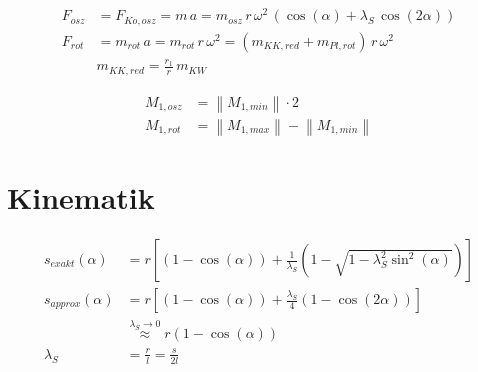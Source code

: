\documentclass[english,threecolumn,color]{latex4ei/latex4ei_sheet}
\begin{document}
\begin{sectionbox}
	\begin{align*}
	F_{osz}&=F_{Ko,osz}=m\,a
	=m_{osz}\,r\,\omega^2\,\left( \cos(\alpha)+\lambda_S\,\cos(2\alpha) \right)\\
	F_{rot}&=m_{rot}\,a=m_{rot}\,r\,\omega^2
	=\left( m_{KK,red}+m_{Pl,rot} \right)\,r\,\omega^2\\
	&m_{KK,red}=\frac{r_1}{r}\,m_{KW}
	\end{align*}
\end{sectionbox}
\begin{sectionbox}
	\begin{align*}
		M_{1,osz}&= \left\|M_{1,min}\right\|\cdot 2\\
		M_{1,rot}&=\left\|M_{1,max}\right\| -\left\|M_{1,min}\right\|
	\end{align*}
\end{sectionbox}

\columnbreak
\section{Kinematik}

\begin{sectionbox}
	\begin{align*}
		s_{exakt}(\alpha)&=r \left[ ( 1- \cos(\alpha) )+\frac{1}{\lambda_S} \left( 1- \sqrt{1-\lambda_S^2  \sin^2(\alpha)} \right) \right]\\
		s_{approx}(\alpha)&=r  \left[ ( 1- \cos(\alpha) )+ \frac{\lambda_S}{4} ( 1- \cos(2 \alpha) ) \right]\\
		&\overset{\lambda_S \to 0}{\approx} r  ( 1- \cos(\alpha) )\\
		\lambda_S&=\frac{r}{l}=\frac{s}{2 l}
	\end{align*}
\end{sectionbox}
\end{document}
